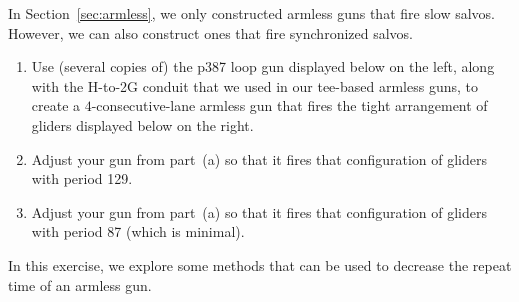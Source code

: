 \begin{multicols}{2}
	
	\mfilbreak
	
	
	\begin{problem}\label{exer:armless_tee}
		In Section~\ref{sec:armless}, we only constructed armless guns that fire slow salvos. However, we can also construct ones that fire synchronized salvos.\smallskip
		
		\begin{enumerate}[label=\bf\color{ocre}(\alph*)]
			\item {} Use (several copies of) the p387 loop gun displayed below on the left, along with the H-to-2G conduit that we used in our tee-based armless guns, to create a $4$-consecutive-lane armless gun that fires the tight arrangement of gliders displayed below on the right.\\[-0.6cm]
			
			\begin{center}
				\begin{minipage}[t]{.575\linewidth}\vspace{0pt}
					\centering {}
				\end{minipage} \hfill %
				\begin{minipage}[t]{.38\linewidth}\vspace{0pt}
					\centering {}
				\end{minipage}
			\end{center}
		
			\item {} Adjust your gun from part~(a) so that it fires that configuration of gliders with period 129.
			
			\noindent [Hint: $129 \times 3 = 387$.]
			
			\item {} Adjust your gun from part~(a) so that it fires that configuration of gliders with period 87 (which is minimal).
			
			\noindent [Hint: $387+6 \times 8 = 435 = 87\times5$, so first adjust each loop to be 6fd bigger.]
		\end{enumerate}
	\end{problem}


	\mfilbreak


	\begin{problem}\label{exer:armless_tee_decrease_repeat_time}
		In this exercise, we explore some methods that can be used to decrease the repeat time of an armless gun.\smallskip
		

\end{problem}
\end{multicols}
